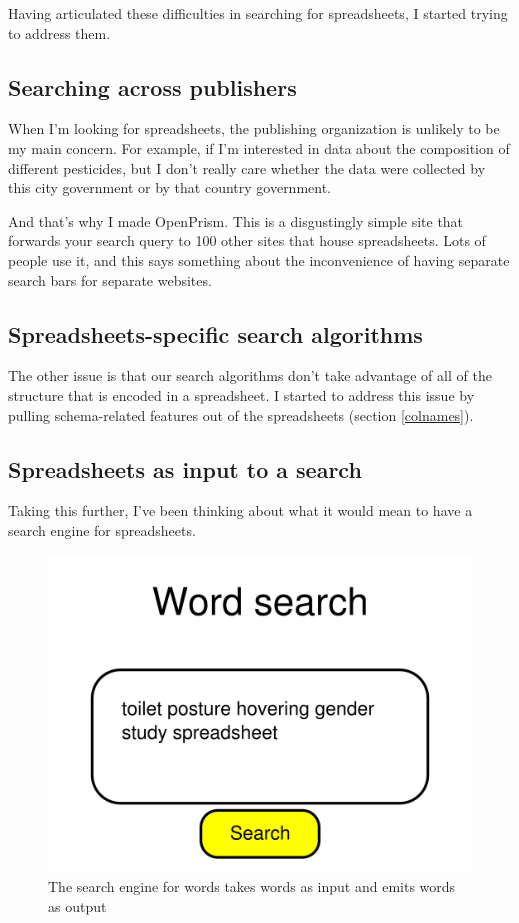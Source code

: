 \documentclass{acm_proc_article-sp}
\begin{document}
Having articulated these difficulties in searching for spreadsheets, I started
trying to address them.

\subsection{Searching across publishers}
When I'm looking for spreadsheets, the publishing organization is unlikely
to be my main concern. For example, if I'm interested in data about the
composition of different pesticides, but I don't really care whether the
data were collected by this city government or by that country government.

And that's why I made OpenPrism. This is a disgustingly simple site that
forwards your search query to 100 other sites that house spreadsheets.
Lots of people use it, and this says something about the inconvenience of
having separate search bars for separate websites.

\subsection{Spreadsheets-specific search algorithms}
The other issue is that our search algorithms don't take advantage of all
of the structure that is encoded in a spreadsheet.
I started to address this issue by pulling schema-related features out
of the spreadsheets (section \ref{colnames}).

\subsection{Spreadsheets as input to a search}
Taking this further, I've been thinking
about what it would mean to have a search engine for spreadsheets.

\begin{figure}
\includegraphics[width=\columnwidth]{../pagerank-for-spreadsheets/wordsearch.png}
\caption{The search engine for words takes words as input and emits words as output}
\centering
\end{figure}
\end{document}
